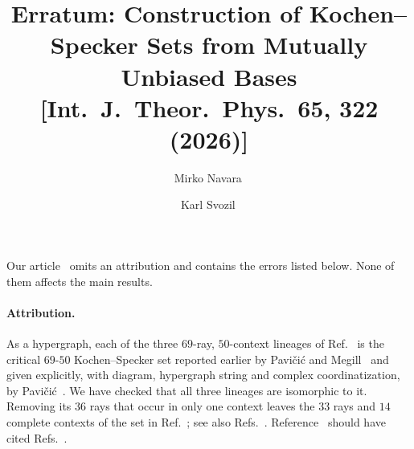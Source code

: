 \documentclass[%
  reprint,
  superscriptaddress,
  amsmath,amssymb,
  aps,pra,
  longbibliography,
  floatfix
]{revtex4-2}
\begin{document}
\title{Erratum: Construction of Kochen--Specker Sets from Mutually Unbiased Bases [Int.\ J.\ Theor.\ Phys.\ \textbf{65}, 322 (2026)]}

\author{Mirko Navara\,}

\author{Karl Svozil\,}

\maketitle

Our article~\cite{svozil-2025-MYOCHS} omits an attribution and contains the errors listed below.
None of them affects the main results.

\paragraph*{Attribution.}
As a hypergraph, each of the three $69$-ray, $50$-context lineages of Ref.~\cite{svozil-2025-MYOCHS} is the critical $69$-$50$ Kochen--Specker set reported earlier by Pavi\v{c}i\'{c} and Megill~\cite[Table~I]{pavicic-megill-2022} and given explicitly, with diagram, hypergraph string and complex coordinatization, by Pavi\v{c}i\'{c}~\cite[Fig.~10(e), Table~2, and Appendix~C]{Pavicic_2023}.
We have checked that all three lineages are isomorphic to it.
Removing its $36$ rays that occur in only one context leaves the $33$ rays and $14$ complete contexts of the set in Ref.~\cite{Cabello2025}; see also Refs.~\cite{Pavicic-2025-simplest,Pavicic-2026-entropy}.
Reference~\cite{svozil-2025-MYOCHS} should have cited Refs.~\cite{pavicic-megill-2022,Pavicic_2023}.
\end{document}
